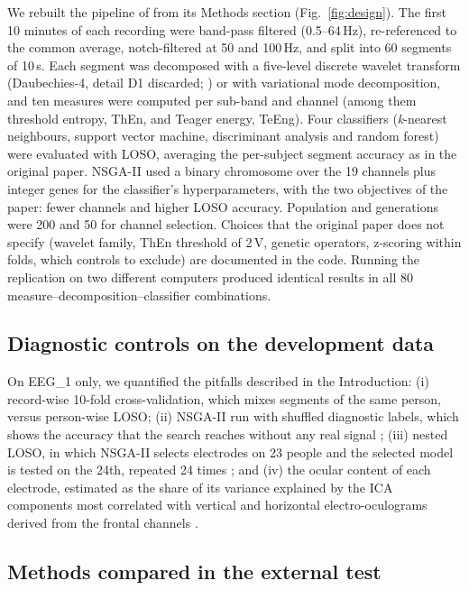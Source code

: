 We rebuilt the pipeline of \citet{aljalal2024} from its Methods section (Fig.~\ref{fig:design}). The first 10 minutes of each recording were band-pass filtered (0.5--64\,Hz), re-referenced to the common average, notch-filtered at 50 and 100\,Hz, and split into 60 segments of 10\,s. Each segment was decomposed with a five-level discrete wavelet transform (Daubechies-4, detail D1 discarded; \citealp{mallat1989}) or with variational mode decomposition, and ten measures were computed per sub-band and channel (among them threshold entropy, ThEn, and Teager energy, TeEng). Four classifiers (\emph{k}-nearest neighbours, support vector machine, discriminant analysis and random forest) were evaluated with LOSO, averaging the per-subject segment accuracy as in the original paper. NSGA-II used a binary chromosome over the 19 channels plus integer genes for the classifier's hyperparameters, with the two objectives of the paper: fewer channels and higher LOSO accuracy. Population and generations were 200 and 50 for channel selection. Choices that the original paper does not specify (wavelet family, ThEn threshold of 2\,\textmu V, genetic operators, z-scoring within folds, which controls to exclude) are documented in the code. Running the replication on two different computers produced identical results in all 80 measure--decomposition--classifier combinations.

\subsection{Diagnostic controls on the development data}

On EEG\_1 only, we quantified the pitfalls described in the Introduction: (i) record-wise 10-fold cross-validation, which mixes segments of the same person, versus person-wise LOSO; (ii) NSGA-II run with shuffled diagnostic labels, which shows the accuracy that the search reaches without any real signal \citep{ojala2010}; (iii) nested LOSO, in which NSGA-II selects electrodes on 23 people and the selected model is tested on the 24th, repeated 24 times \citep{varma2006}; and (iv) the ocular content of each electrode, estimated as the share of its variance explained by the ICA components most correlated with vertical and horizontal electro-oculograms derived from the frontal channels \citep{jung2000}.

\subsection{Methods compared in the external test}

